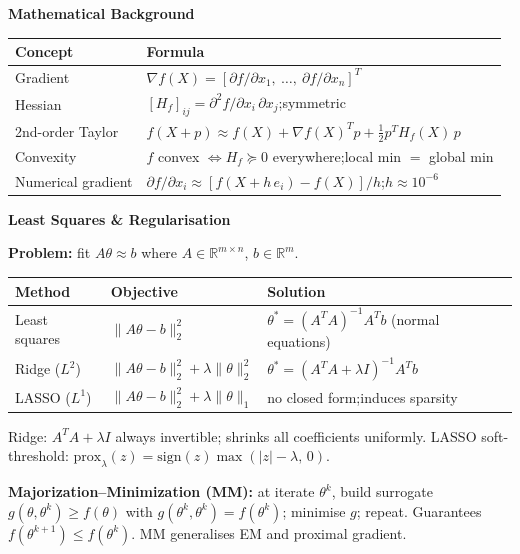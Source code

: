 \documentclass[10pt,a4paper]{article}
\newcommand{\sectionbox}[1]{%
  \begin{mdframed}[backgroundcolor=headbg, linewidth=0pt,
    innertopmargin=4pt, innerbottommargin=4pt,
    innerleftmargin=6pt, innerrightmargin=6pt]
    \large\bfseries\color{white}#1
  \end{mdframed}\vspace{2pt}
}
\begin{document}
\vspace{4pt}
\sectionbox{Mathematical Background}

\begin{tabular}{@{}ll@{}}
\toprule
Concept & Formula \\
\midrule
Gradient & $\nabla f(X) = [\partial f/\partial x_1,\ \ldots,\ \partial f/\partial x_n]^T$ \\
Hessian & $[H_f]_{ij} = \partial^2 f/\partial x_i\,\partial x_j$;\quad symmetric \\
2nd-order Taylor & $f(X{+}p) \approx f(X) + \nabla f(X)^T p + \tfrac{1}{2}p^T H_f(X)\,p$ \\
Convexity & $f$ convex $\Leftrightarrow H_f \succeq 0$ everywhere;\quad local min $=$ global min \\
Numerical gradient & $\partial f/\partial x_i \approx [f(X + h\,e_i) - f(X)]/h$;\quad $h \approx 10^{-6}$ \\
\bottomrule
\end{tabular}

\vspace{4pt}
\sectionbox{Least Squares \& Regularisation}

\textbf{Problem:} fit $A\theta \approx b$ where $A \in \mathbb{R}^{m\times n}$, $b \in \mathbb{R}^m$.

\begin{tabular}{@{}lll@{}}
\toprule
Method & Objective & Solution \\
\midrule
Least squares & $\|A\theta - b\|_2^2$ & $\theta^* = (A^TA)^{-1}A^Tb$ \;(normal equations) \\
Ridge ($L^2$) & $\|A\theta - b\|_2^2 + \lambda\|\theta\|_2^2$ & $\theta^* = (A^TA + \lambda I)^{-1}A^Tb$ \\
LASSO ($L^1$) & $\|A\theta - b\|_2^2 + \lambda\|\theta\|_1$ & no closed form;\quad induces sparsity \\
\bottomrule
\end{tabular}

\vspace{2pt}
Ridge: $A^TA + \lambda I$ always invertible; shrinks all coefficients uniformly.\quad
LASSO soft-threshold: $\mathrm{prox}_\lambda(z)=\mathrm{sign}(z)\max(|z|-\lambda,\,0)$.

\vspace{2pt}
\textbf{Majorization--Minimization (MM):} at iterate $\theta^k$, build surrogate
$g(\theta,\theta^k) \geq f(\theta)$ with $g(\theta^k,\theta^k)=f(\theta^k)$; minimise $g$; repeat.
Guarantees $f(\theta^{k+1})\le f(\theta^k)$. MM generalises EM and proximal gradient.
\end{document}
